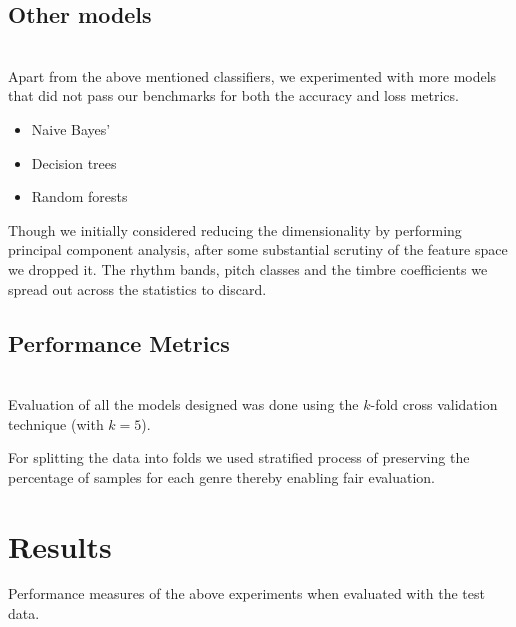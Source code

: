 \documentclass[fleqn,10pt]{SelfArx} %
\begin{document}
\subsection*{Other models}~\\
Apart from the above mentioned classifiers, we experimented with more models that did not pass our benchmarks for both the accuracy and loss metrics. 
\begin{itemize}
	\item Naive Bayes'
	\item Decision trees
	\item Random forests
\end{itemize}

Though we initially considered reducing the dimensionality by performing principal component analysis, after some substantial scrutiny of the feature space we dropped it. The rhythm bands, pitch classes and the timbre coefficients we spread out across the statistics to discard.

\subsection*{Performance Metrics}~\\
Evaluation of all the models designed was done using the $k$-fold cross validation technique (with $k=5$). 

For splitting the data into folds we used stratified process of preserving the percentage of samples for each genre thereby enabling fair evaluation.



\section{Results}

Performance measures of the above experiments when evaluated with the test data.
\end{document}
